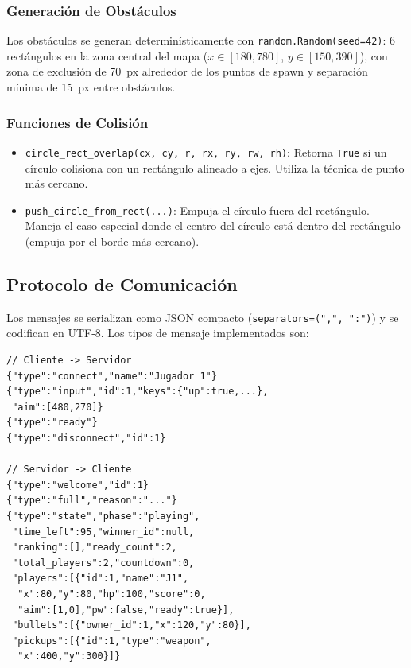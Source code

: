 \documentclass[conference]{IEEEtran}
\begin{document}
\subsubsection{Generaci\'on de Obst\'aculos}

Los obst\'aculos se generan determin\'isticamente con \texttt{random.Random(seed=42)}: 6 rect\'angulos en la zona central del mapa ($x \in [180, 780]$, $y \in [150, 390]$), con zona de exclusi\'on de 70~px alrededor de los puntos de spawn y separaci\'on m\'inima de 15~px entre obst\'aculos.

\subsubsection{Funciones de Colisi\'on}

\begin{itemize}
    \item \texttt{circle\_rect\_overlap(cx, cy, r, rx, ry, rw, rh)}: Retorna \texttt{True} si un c\'irculo colisiona con un rect\'angulo alineado a ejes. Utiliza la t\'ecnica de punto m\'as cercano.
    \item \texttt{push\_circle\_from\_rect(...)}: Empuja el c\'irculo fuera del rect\'angulo. Maneja el caso especial donde el centro del c\'irculo est\'a dentro del rect\'angulo (empuja por el borde m\'as cercano).
\end{itemize}

\subsection{Protocolo de Comunicaci\'on}

Los mensajes se serializan como JSON compacto (\texttt{separators=(",", ":")}) y se codifican en UTF-8. Los tipos de mensaje implementados son:

\begin{lstlisting}[caption={Mensajes del protocolo.},label={lst:protocol2}]
// Cliente -> Servidor
{"type":"connect","name":"Jugador 1"}
{"type":"input","id":1,"keys":{"up":true,...},
 "aim":[480,270]}
{"type":"ready"}
{"type":"disconnect","id":1}

// Servidor -> Cliente
{"type":"welcome","id":1}
{"type":"full","reason":"..."}
{"type":"state","phase":"playing",
 "time_left":95,"winner_id":null,
 "ranking":[],"ready_count":2,
 "total_players":2,"countdown":0,
 "players":[{"id":1,"name":"J1",
  "x":80,"y":80,"hp":100,"score":0,
  "aim":[1,0],"pw":false,"ready":true}],
 "bullets":[{"owner_id":1,"x":120,"y":80}],
 "pickups":[{"id":1,"type":"weapon",
  "x":400,"y":300}]}
\end{lstlisting}
\end{document}
